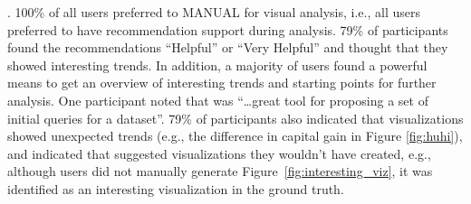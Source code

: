 . 
100\% of all users preferred \SeeDB to MANUAL for
visual analysis, i.e., all users preferred to have recommendation support during analysis.
79\% of participants found the recommendations ``Helpful'' or ``Very Helpful'' and thought that they
showed interesting trends.
In addition, a majority of users found \SeeDB a powerful means to get an overview of interesting trends
and starting points for further analysis. 
One participant noted that \SeeDB was ``\ldots great tool for proposing a set of initial queries for a dataset''.
79\% of participants also indicated that \SeeDB visualizations showed unexpected trends (e.g., the difference
in capital gain in Figure \ref{fig:huhi}), and indicated that \SeeDB suggested visualizations
they wouldn't have created, e.g., although users did not 
manually generate Figure~\ref{fig:interesting_viz}, it was
identified as an interesting visualization in the ground truth.

